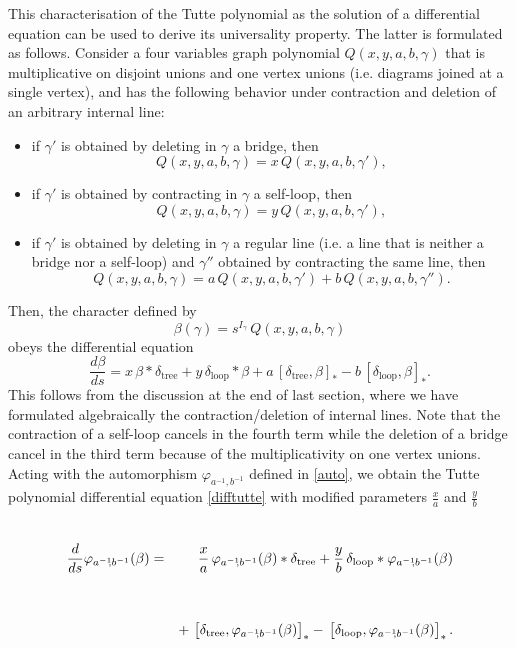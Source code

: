 \documentclass[10pt,here,feynmf]{article}
\begin{document}
This characterisation of the Tutte polynomial as the solution of a differential equation can be used to derive its universality property. The latter is formulated  as follows. Consider a four variables graph polynomial $Q(x,y,a,b,\gamma)$ that is multiplicative on disjoint unions and one vertex unions (i.e. diagrams joined at a single vertex), and has the following  behavior under contraction and deletion of an arbitrary internal line:
\begin{itemize}
\item
if $\gamma'$ is obtained by deleting in $\gamma$ a bridge, then
\begin{equation}
Q(x,y,a,b,\gamma)=x\,Q(x,y,a,b,\gamma'),
\end{equation}
\item
if $\gamma'$ is obtained by contracting in $\gamma$ a self-loop, then
\begin{equation}
Q(x,y,a,b,\gamma)=y\,Q(x,y,a,b,\gamma'),
\end{equation}
\item
if $\gamma'$ is obtained by deleting in $\gamma$ a regular line (i.e. a line that is neither a bridge nor a self-loop) and $\gamma''$ obtained by contracting the same line, then
\begin{equation}
Q(x,y,a,b,\gamma)=a\,Q(x,y,a,b,\gamma')+b\,Q(x,y,a,b,\gamma'').
\end{equation}
\end{itemize}
Then, the character defined by
\begin{equation} 
\beta(\gamma)=s^{I_{\gamma}}\,Q(x,y,a,b,\gamma)
\end{equation}
obeys the differential equation
\begin{equation}
\frac{d\beta}{ds}
=x\,\beta\ast\delta_{\mathrm{tree}}
+y\,\delta_{\mathrm{loop}}\ast\beta+a\,\left[\delta_{\mathrm{tree}},\beta\right]_{\ast}
-b\,\left[\delta_{\mathrm{loop}},\beta\right]_{\ast}.
\end{equation}
This follows from the discussion at the end of last section, where we  have formulated algebraically the contraction/deletion of internal lines. Note that the contraction of a self-loop cancels in the fourth term  while the deletion of a bridge cancel in the third term because of the multiplicativity on one vertex unions. Acting with the automorphism $\varphi_{a^{-1}\!\!,b^{-1}}$ defined in \eqref{auto}, we obtain the Tutte polynomial differential equation \eqref{difftutte} with modified parameters $\frac{x}{a}$ and $\frac{y}{b}$
\begin{eqnarray}
\renewcommand{\baselinestretch}{4}
\frac{d}{ds}\varphi_{a^{-1}\!\!,b^{-1}}(\beta)
&=&\frac{x}{a}\,\varphi_{a^{-1}\!\!,b^{-1}}(\beta)\ast\delta_{\mathrm{tree}}
+\frac{y}{b}\,\delta_{\mathrm{loop}}\ast\varphi_{a^{-1}\!\!,b^{-1}}(\beta)\cr
&&+\,\left[\delta_{\mathrm{tree}},\varphi_{a^{-1}\!\!,b^{-1}}(\beta)\right]_{\ast}
-\,\left[\delta_{\mathrm{loop}},\varphi_{a^{-1}\!\!,b^{-1}}(\beta)\right]_{\ast}.
\end{eqnarray}
\end{document}
